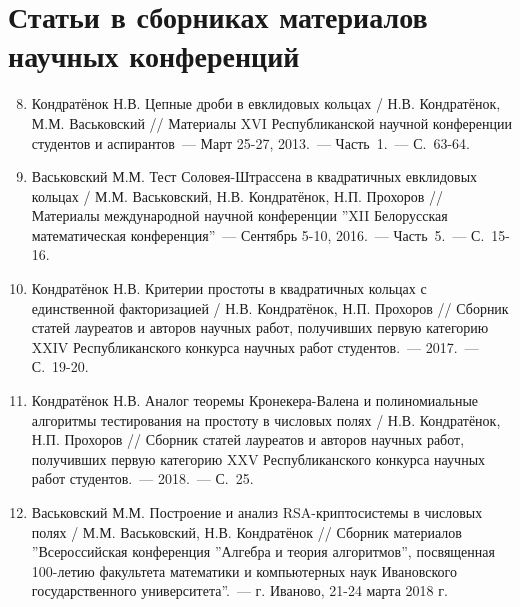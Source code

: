 \documentclass[_00_autoref.tex]{subfiles}
\begin{document}
\vspace{-4ex}
\section*{\fontsize{14}{15}\selectfont Статьи в сборниках материалов научных конференций}
\vspace{-4ex}

\begin{enumerate}
\setcounter{enumi}{7}

    \item \label{source:Republican_Scientific_Conference_of_Students_and_Postgraduates_2013}
    Кондратёнок Н.В. Цепные дроби в евклидовых кольцах / Н.В. Кондратёнок, М.М. Васьковский // Материалы XVI Республиканской научной конференции студентов и аспирантов~--- Март 25-27, 2013.~--- Часть~1.~--- С.~63-64.

    \item \label{source:XII_Belarussian_math_conference_2016}
    Васьковский М.М. Тест Соловея-Штрассена в квадратичных евклидовых кольцах / М.М. Васьковский, Н.В. Кондратёнок, Н.П. Прохоров // Материалы международной научной конференции ''XII Белорусская математическая конференция''~--- Сентябрь 5-10, 2016.~--- Часть~5.~--- С.~15-16.

    \item \label{source:Collection_of_articles_by_laureates_2017}
    Кондратёнок Н.В. Критерии простоты в квадратичных кольцах с единственной факторизацией / Н.В. Кондратёнок, Н.П. Прохоров // Сборник статей лауреатов и авторов научных работ, получивших первую категорию XXIV Республиканского конкурса научных работ студентов.~--- 2017.~--- С.~19-20.

    \item \label{source:Collection_of_articles_by_laureates_2018}
    Кондратёнок Н.В. Аналог теоремы Кронекера-Валена и полиномиальные алгоритмы тестирования на простоту в числовых полях / Н.В. Кондратёнок, Н.П. Прохоров // Сборник статей лауреатов и авторов научных работ, получивших первую категорию XXV Республиканского конкурса научных работ студентов.~--- 2018.~--- С.~25.

    \item \label{source:Algebra_and_theory_of_algorithms}
    Васьковский М.М. Построение и анализ RSA-криптосистемы в числовых полях / М.М. Васьковский, Н.В. Кондратёнок // Сборник материалов ''Всероссийская конференция ''Алгебра и теория алгоритмов'', посвященная 100-летию факультета математики и компьютерных наук Ивановского государственного университета''.~--- г. Иваново, 21-24 марта 2018 г.


\end{enumerate}
\end{document}
